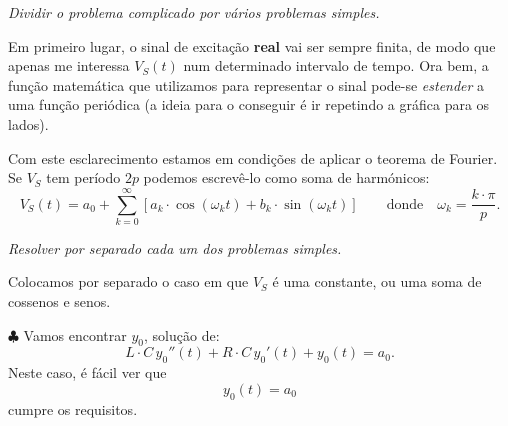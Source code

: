 \begin{enumerate}[{\bfseries [1]}]
  \item\textit{\color{blue} Dividir o problema complicado por vários problemas simples.}

    Em primeiro lugar, o sinal de excitação \textbf{real} vai ser sempre finita, de modo que apenas me interessa $V_S(t)$ num determinado intervalo de tempo. Ora bem, a função matemática que utilizamos para representar o sinal pode-se \textit{estender} a uma função periódica (a ideia para o conseguir é ir repetindo a gráfica para os lados).

Com este esclarecimento estamos em condições de aplicar o teorema de Fourier. Se $V_S$ tem período $2p$ podemos escrevê-lo como soma de harmónicos:
\[
V_S(t) = a_0 + \sum_{k=0}^{\infty} [a_k \cdot \cos(\omega_kt) + b_k \cdot \sin(\omega_kt)]\qquad \text{donde}\quad \omega_k=\frac{k\cdot \pi}{p}.
\]
  \item \textit{\color{blue}Resolver por separado cada um dos problemas simples.}

Colocamos por separado o caso em que $V_S$ é uma constante, ou uma soma de cossenos e senos.

 $\clubsuit$ Vamos encontrar $y_0$, solução de:
\[
L\cdot C \,y_0 '' (t) + R\cdot C\, y_0'(t) + y_0(t) = a_0.
\]
Neste caso, é fácil ver que
\[\boxed{
y_0(t) = a_0
}\]
cumpre os requisitos.


\end{enumerate}
